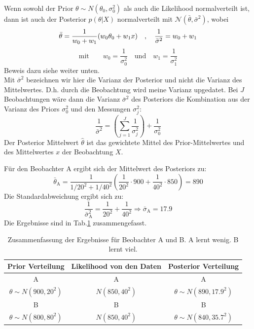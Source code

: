 Wenn sowohl der Prior $\theta \sim N(\theta_0,\sigma_0^2)$ als auch die 
Likelihood normalverteilt ist, dann ist auch der Posterior $p(\theta|X)$ normalverteilt mit $\mathcal{N}(\bar{\theta},\bar{\sigma}^2)$, wobei
\begin{equation}
\bar{\theta} = \frac{1}{w_0+w_1}(w_0 \theta_0 + w_1 x)\quad, \quad
\frac{1}{\bar{\sigma}^2}=w_0 + w_1 \\
\label{eq:prior_Normal}
\end{equation}
\[
\mathrm{mit} \quad \quad w_0 = \frac{1}{\sigma_0^2} \quad \mathrm{und} \quad w_1=\frac{1}{\sigma_1^2}
\]
Beweis dazu siehe weiter unten. \\
Mit $\bar{\sigma}^2$ bezeichnen wir hier die Varianz der Posterior 
und nicht die Varianz des Mittelwertes. D.h. durch die Beobachtung
wird meine Varianz upgedatet. Bei $J$ Beobachtungen wäre dann die Varianz $\bar{\sigma}^2$ des Posteriors die Kombination aus der
Varianz des Priors $\sigma_0^2$ und den Messungen $\sigma_j^2$:
\[
\frac{1}{\bar{\sigma}^2} = \left( \sum_{j=1}^{J} 
\frac{1}{\sigma_j^2}\right) + \frac{1}{\sigma_0^2} 
\] 
Der Posterior Mittelwert $\hat{\theta}$ ist das gewichtete Mittel des Prior-Mittelwertes
und des Mittelwertes $x$ der Beobachtung $X$. 

Für den Beobachter A ergibt sich der Mittelwert des Posteriors zu:
\[
\bar{\theta}_\mathrm{A} = \frac{1}{1/20^2+1/40^2}\left( \frac{1}{20^2}\cdot 900 + 
 \frac{1}{40^2}\cdot 850  \right) = 890
\]
Die Standardabweichung ergibt sich zu: 
\[
\frac{1}{\bar{\sigma}_\mathrm{A}^2}=\frac{1}{20^2} + \frac{1}{40^2} \Rightarrow
\bar{\sigma}_\mathrm{A} = 17.9
\]
Die Ergebnisse sind in Tab.\ref{tab:Ergebnisse des Beispiels} zusammengefasst.
\begin{table}[!h]
	\caption{Zusammenfassung der Ergebnisse für Beobachter A und B. A lernt 
	wenig. B lernt viel.}
	\centering
	\begin{tabular}{c c c}  \hline 
		Prior Verteilung & Likelihood von den Daten & Posterior Verteilung\\
		\hline
		A & A & A \\
		$\theta \sim N(900, 20^2)$ &$N(850,40^2)$ & $\theta \sim N(890, 17.9^2)$ \\ 
		B &B & B \\
		$\theta \sim N(800, 80^2)$ &$N(850,40^2)$ & $\theta \sim N(840, 35.7^2)$ \\
		\hline 
	\end{tabular}
	\label{tab:Ergebnisse des Beispiels}
\end{table}

